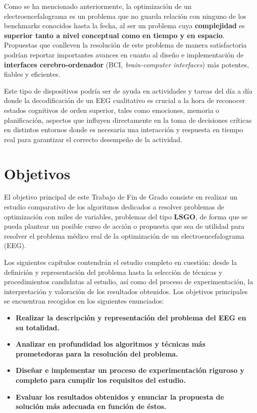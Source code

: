 Como se ha mencionado anteriormente, la optimización de un electroencefalograma es un problema que no guarda relación con ninguno de los benchmarks conocidos hasta la fecha, al ser un problema cuya \textbf{complejidad} es \textbf{superior tanto a nivel conceptual como en tiempo y en espacio}. Propuestas que conlleven la resolución de este problema de manera satisfactoria podrían reportar importantes avances en cuanto al diseño e implementación de \textbf{interfaces cerebro-ordenador} (BCI, \textit{brain-computer interfaces}) \cite{BCI} más potentes, fiables y eficientes.

Este tipo de dispositivos podría ser de ayuda en actividades y tareas del día a día donde la decodificación de un EEG cualitativo es crucial a la hora de reconocer estados cognitivos de orden superior, tales como emociones, memoria o planificación, aspectos que influyen directamente en la toma de decisiones críticas\cite{EvolutionaryBigOpt} en distintos entornos donde es necesaria una interacción y respuesta en tiempo real para garantizar el correcto desempeño de la actividad.

\section{Objetivos}

El objetivo principal de este Trabajo de Fin de Grado consiste en realizar un estudio comparativo de los algoritmos dedicados a resolver problemas de optimización con miles de variables, problemas del tipo \textbf{LSGO}, de forma que se pueda plantear un posible curso de acción o propuesta que sea de utilidad para resolver el problema médico real de la optimización de un electroencefalograma (EEG).

Los siguientes capítulos contendrán el estudio completo en cuestión: desde la definición y representación del problema hasta la selección de técnicas y procedimientos candidatas al estudio, así como del proceso de experimentación, la interpretación y valoración de los resultados obtenidos. Los objetivos principales se encuentran recogidos en los siguientes enunciados:

\begin{itemize}
	\item \textbf{Realizar la descripción y representación del problema del EEG en su totalidad.}
	\item \textbf{Analizar en profundidad los algoritmos y técnicas más prometedoras para la resolución del problema.}
	\item \textbf{Diseñar e implementar un proceso de experimentación riguroso y completo para cumplir los requisitos del estudio.}
	\item \textbf{Evaluar los resultados obtenidos y enunciar la propuesta de solución más adecuada en función de éstos.}
\end{itemize}

